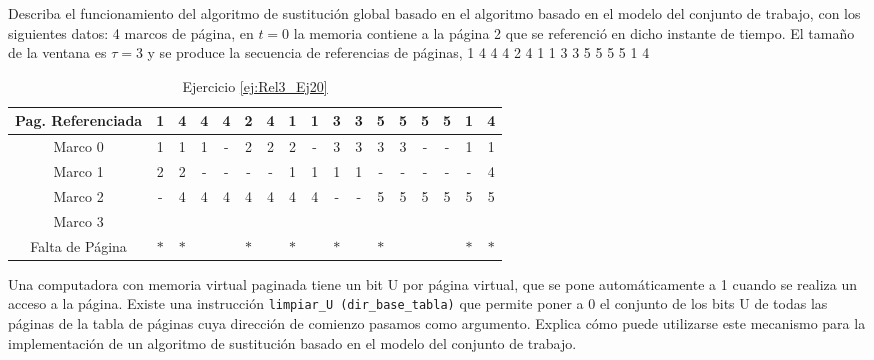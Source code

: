 \begin{ejercicio} \label{ej:Rel3_Ej20}
    Describa el funcionamiento del algoritmo de sustitución global basado en el algoritmo
basado en el modelo del conjunto de trabajo, con los siguientes datos: 4 marcos de
página, en $t= 0$ la memoria contiene a la página 2 que se referenció en dicho instante de
tiempo. El tamaño de la ventana es $\tau=3$ y se produce la secuencia de referencias de
páginas, 1 4 4 4 2 4 1 1 3 3 5 5 5 5 1 4
    \begin{table}[H]
        \centering
        \begin{tabular}{|c|c|c|c|c|c|c|c|c|c|c|c|c|c|c|c|c|}
        Pag. Referenciada & 1 & 4 & 4 & 4 & 2 & 4 & 1 & 1 & 3 & 3 & 5 & 5 & 5 & 5 & 1 & 4 \\ \hline \hline
        Marco 0           & 1 & 1 & 1 & - & 2 & 2 & 2 & - & 3 & 3 & 3 & 3 & - & - & 1 & 1 \\ \hline
        Marco 1           & 2 & 2 & - & - & - & - & 1 & 1 & 1 & 1 & - & - & - & - & - & 4 \\ \hline
        Marco 2           & - & 4 & 4 & 4 & 4 & 4 & 4 & 4 & - & - & 5 & 5 & 5 & 5 & 5 & 5 \\ \hline
        Marco 3           &   &   &   &   &   &   &   &   &   &   &   &   &   &   &   &   \\ \hline \hline
        Falta de Página   & $\ast$ & $\ast$ &   &   & $\ast$ &   & $\ast$ &   & $\ast$ &   & $\ast$ &   &   &   & $\ast$ & $\ast$
        \end{tabular}
        \caption{Ejercicio \ref{ej:Rel3_Ej20}}
        \label{tab:Rel3_Ej20}
    \end{table}
\end{ejercicio}



\begin{ejercicio}
    Una computadora con memoria virtual paginada tiene un bit U por página virtual, que se
pone automáticamente a 1 cuando se realiza un acceso a la página. Existe una
instrucción \verb|limpiar_U (dir_base_tabla)| que permite poner a 0 el conjunto de los bits U de
todas las páginas de la tabla de páginas cuya dirección de comienzo pasamos como
argumento. Explica cómo puede utilizarse este mecanismo para la implementación de un
algoritmo de sustitución basado en el modelo del conjunto de trabajo.
\end{ejercicio}


